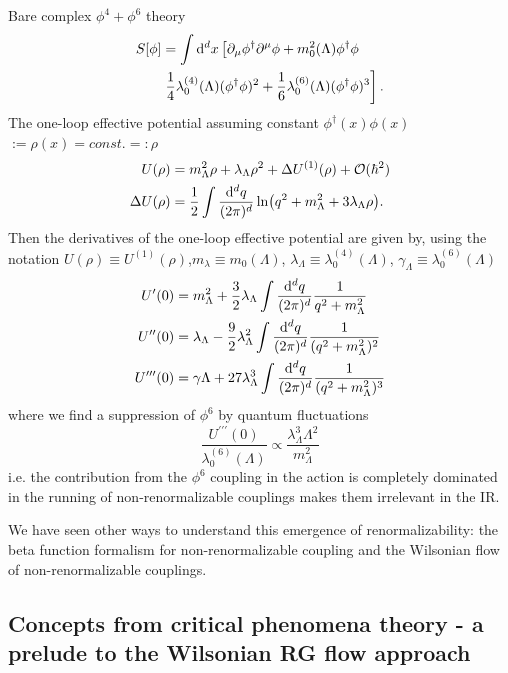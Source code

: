 \begin{mybox}{}
	Bare complex $\phi^4+\phi^6$ theory
	\begin{align}
	S[\phi] &= \int \mathrm{d}^d x \left[\partial_\mu \phi^\dagger \partial^\mu \phi + m^2_0(\Lambda) \phi^\dagger \phi \right.\\
	&\left.\frac{1}{4} \lambda^{(4)}_0(\Lambda) (\phi^\dagger \phi)^2 + \frac{1}{6} \lambda^{(6)}_0(\Lambda)(\phi^\dagger \phi)^3 \right] \nonumber.
	\end{align}
	The one-loop effective potential assuming constant $\phi^\dagger(x)\phi(x)$$:=\rho(x)=const.=:\rho$
	\begin{align}
	U(\rho) &= m^2_\Lambda \rho + \lambda_\Lambda \rho^2 + \Delta U^{(1)}(\rho) + \mathcal{O}(\hbar^2)\\
	\Delta U(\rho) &= \frac{1}{2} \int \frac{\mathrm{d}^d q}{(2\pi)^d} \ln(q^2+m^2_\Lambda+3\lambda_\Lambda \rho).
	\end{align}
	Then the derivatives of the one-loop effective potential are given by, using the notation $U(\rho)\equiv U^{(1)}(\rho)$,$m_\lambda\equiv m_0(\Lambda)$, $\lambda_\Lambda\equiv \lambda^{(4)}_0(\Lambda)$, $\gamma_\Lambda\equiv \lambda^{(6)}_0(\Lambda)$
	\begin{align}
	U^\prime(0) &= m^2_\Lambda + \frac{3}{2} \lambda_\Lambda \int \frac{\mathrm{d}^d q}{(2 \pi)^d} \frac{1}{q^2+m^2_\Lambda}\\
	U^{\prime \prime}(0) &= \lambda_\Lambda - \frac{9}{2} \lambda^2_\Lambda \int \frac{\mathrm{d}^d q}{(2 \pi)^d} \frac{1}{(q^2+m^2_\Lambda)^2}\\
	U^{\prime \prime \prime}(0) &= \gamma\Lambda + 27 \lambda^3_\Lambda \int \frac{\mathrm{d}^d q}{(2 \pi)^d} \frac{1}{(q^2+m^2_\Lambda)^3}
	\end{align}
	where we find a suppression of $\phi^6$ by quantum fluctuations
	\begin{equation}
	\frac{U^{\prime \prime \prime}(0)}{\lambda^{(6)}_0(\Lambda)} \propto \frac{\lambda^3_\Lambda \Lambda^2}{m^2_\Lambda}
	\end{equation}
	i.e. the contribution from the $\phi^6$ coupling in the action is completely dominated in the running of non-renormalizable couplings makes them irrelevant in the IR.
\end{mybox}
We have seen other ways to understand this emergence of renormalizability: the beta function formalism for non-renormalizable coupling and the Wilsonian flow of non-renormalizable couplings.




\subsection{Concepts from critical phenomena theory - a prelude to the Wilsonian RG flow approach}
